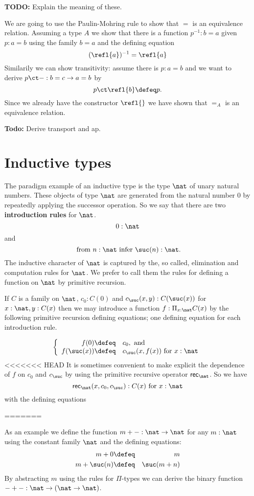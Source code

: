 {\textbf{TODO:} Explain the meaning of these.

We are going to use the Paulin-Mohring rule to show that $=$ is an
equivalence relation. Assuming a type $A$ we show that there is a function
$p^{-1} : b = a$ given $p : a = b$ using the family $b = a$ and
the defining equation
\[ (\refl{a})^{-1} = \refl{a} \]
Similarily we can show transitivity: assume there is $p : a = b$ and
we want to derive $p \ct - : b = c \to a = b$ by
\[ p \ct \refl{b} \defeq p.\]
Since we already have the constructor $\refl{}$ we have shown that $=_A$
is an equivalence relation. 


\textbf{Todo:} Derive transport and ap.

\section{Inductive types}
\label{sec:inductive-types}

The paradigm example of an inductive type is the type $\nat$ of unary natural numbers.  These objects of type $\nat$ are generated from the natural number $0$ by repeatedly applying the successor operation.  So we say that there are two {\bf introduction rules} for $\nat$. 
  \[ 0:\nat\]
and
  \[ \mbox{ from $n:\nat$ infer $\suc(n):\nat$}.\]
The inductive character of $\nat$ is captured by the, so called, elimination and computation rules for $\nat$.  We prefer to call them the rules for defining a function on $\nat$ by primitive recursion. 

If $C$ is a family on $\nat$, $c_0:C(0)$ and $c_\suc(x,y):C(\suc(x))$ for $x:\nat,y:C(x)$ then we may introduce a function $f:\Pi_{x:\nat}C(x)$ by the following primitive recursion defining equations; one defining equation for each introduction rule.

  \[\left\{\begin{array}{rl}
f(0)\defeq& c_0, \mbox{ and}\\
f(\suc(x))\defeq& c_\suc(x,f(x))\mbox{ for } x:\nat
  \end{array}\right.\]
<<<<<<< HEAD
It is sometimes convenient to make explicit the dependence of $f$ on $c_0$ and $c_\suc$ by using the primitive recursive operator $\rec_\nat$.  So we have
  \[ \rec_\nat(x,c_0,c_\suc):C(x)\mbox{ for } x:\nat\]
with the defining equations


}%
=======

As an example we define the function $m + - : \nat \to \nat$ for any
$m : \nat$ using the constant family $\nat$ and the defining
equations:
\begin{eqnarray*}
  m + 0 & \defeq & m \\
  m + \suc(n) & \defeq & \suc(m + n)
\end{eqnarray*}
By abstracting $m$ using the rules for $\Pi$-types we can derive the
binary function $- + - : \nat \to (\nat \to \nat)$.

